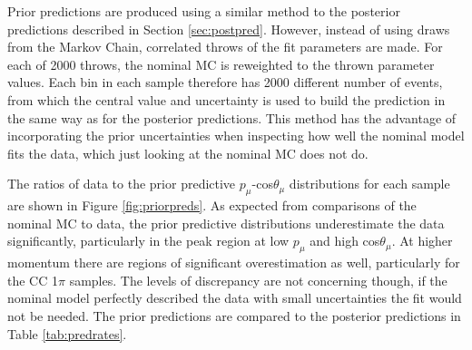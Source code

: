Prior predictions are produced using a similar method to the posterior predictions described in Section \ref{sec:postpred}. However, instead of using draws from the Markov Chain, correlated throws of the fit parameters are made. For each of 2000 throws, the nominal MC is reweighted to the thrown parameter values. Each bin in each sample therefore has 2000 different number of events, from which the central value and uncertainty is used to build the prediction in the same way as for the posterior predictions. This method has the advantage of incorporating the prior uncertainties when inspecting how well the nominal model fits the data, which just looking at the nominal MC does not do. 

The ratios of data to the prior predictive $p_{\mu}$-cos$\theta_{\mu}$ distributions for each sample are shown in Figure \ref{fig:priorpreds}. As expected from comparisons of the nominal MC to data, the prior predictive distributions underestimate the data significantly, particularly in the peak region at low $p_{\mu}$ and high cos$\theta_{\mu}$. At higher momentum there are regions of significant overestimation as well, particularly for the CC 1$\pi$ samples. The levels of discrepancy are not concerning though, if the nominal model perfectly described the data with small uncertainties the fit would not be needed. The prior predictions are compared to the posterior predictions in Table \ref{tab:predrates}.

